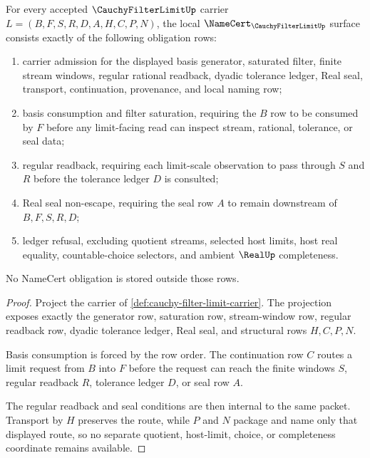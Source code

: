 \begin{theorem}
\label{thm:cauchy-filter-limit-namecert-obligations}
For every accepted $\CauchyFilterLimitUp$ carrier $L=(B,F,S,R,D,A,H,C,P,N)$, the local $\NameCert_{\CauchyFilterLimitUp}$ surface consists exactly of the following obligation rows:
\begin{enumerate}
\item carrier admission for the displayed basis generator, saturated filter, finite stream windows, regular rational readback, dyadic tolerance ledger, Real seal, transport, continuation, provenance, and local naming row;
\item basis consumption and filter saturation, requiring the $B$ row to be consumed by $F$ before any limit-facing read can inspect stream, rational, tolerance, or seal data;
\item regular readback, requiring each limit-scale observation to pass through $S$ and $R$ before the tolerance ledger $D$ is consulted;
\item Real seal non-escape, requiring the seal row $A$ to remain downstream of $B,F,S,R,D$;
\item ledger refusal, excluding quotient streams, selected host limits, host real equality, countable-choice selectors, and ambient $\RealUp$ completeness.
\end{enumerate}
No NameCert obligation is stored outside those rows.
\end{theorem}
\begin{proof}
Project the carrier of \autoref{def:cauchy-filter-limit-carrier}. The projection exposes exactly the generator row, saturation row, stream-window row, regular readback row, dyadic tolerance ledger, Real seal, and structural rows $H,C,P,N$.

Basis consumption is forced by the row order. The continuation row $C$ routes a limit request from $B$ into $F$ before the request can reach the finite windows $S$, regular readback $R$, tolerance ledger $D$, or seal row $A$.

The regular readback and seal conditions are then internal to the same packet. Transport by $H$ preserves the route, while $P$ and $N$ package and name only that displayed route, so no separate quotient, host-limit, choice, or completeness coordinate remains available.
\end{proof}

